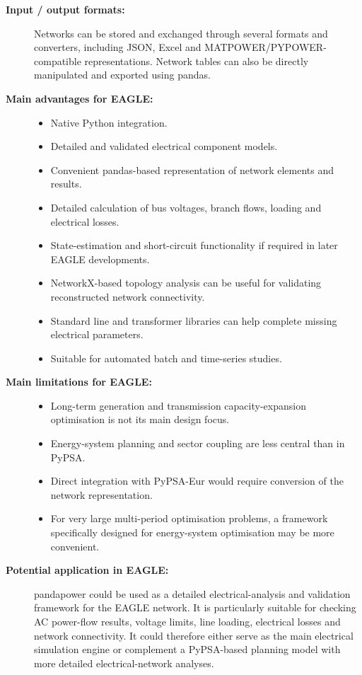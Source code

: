 \begin{description}
    \item[\textbf{Input / output formats:}]
    Networks can be stored and exchanged through several formats and
    converters, including JSON, Excel and MATPOWER/PYPOWER-compatible
    representations. Network tables can also be directly manipulated and
    exported using pandas.

    \item[\textbf{Main advantages for EAGLE:}] \hfill
    \begin{itemize}
        \item Native Python integration.
        \item Detailed and validated electrical component models.
        \item Convenient pandas-based representation of network elements
        and results.
        \item Detailed calculation of bus voltages, branch flows, loading
        and electrical losses.
        \item State-estimation and short-circuit functionality if required
        in later EAGLE developments.
        \item NetworkX-based topology analysis can be useful for validating
        reconstructed network connectivity.
        \item Standard line and transformer libraries can help complete
        missing electrical parameters.
        \item Suitable for automated batch and time-series studies.
    \end{itemize}

    \item[\textbf{Main limitations for EAGLE:}] \hfill
    \begin{itemize}
        \item Long-term generation and transmission capacity-expansion
        optimisation is not its main design focus.
        \item Energy-system planning and sector coupling are less central
        than in PyPSA.
        \item Direct integration with PyPSA-Eur would require conversion of
        the network representation.
        \item For very large multi-period optimisation problems, a framework
        specifically designed for energy-system optimisation may be more
        convenient.
    \end{itemize}

    \item[\textbf{Potential application in EAGLE:}]
    pandapower could be used as a detailed electrical-analysis and validation
    framework for the EAGLE network. It is particularly suitable for checking
    AC power-flow results, voltage limits, line loading, electrical losses
    and network connectivity. It could therefore either serve as the main
    electrical simulation engine or complement a PyPSA-based planning model
    with more detailed electrical-network analyses.

\end{description}


